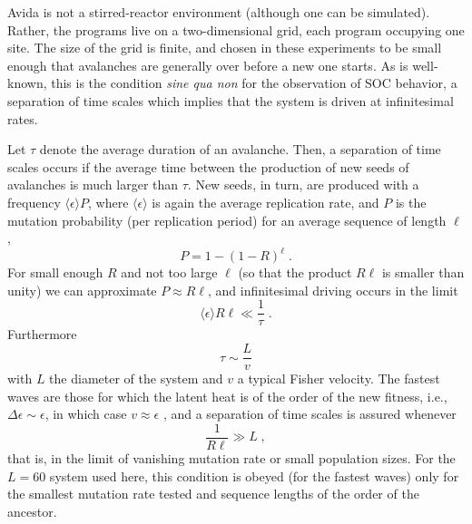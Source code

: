 \documentclass[letterpaper]{article}
\begin{document}
Avida is not a stirred-reactor environment (although one can be
simulated). Rather, the programs live on a two-dimensional grid, each
program occupying one site. The size of the grid is finite, and chosen
in these experiments to be small enough that avalanches are generally
over before a new one starts. As is well-known, this is the condition
{\em sine qua non} for the observation of SOC behavior, a separation
of time scales which implies that the system is driven at
infinitesimal rates.

Let $\tau$ denote the average duration of an avalanche. Then, a
separation of time scales occurs if the average time between the
production of new seeds of avalanches is much larger than $\tau$. New
seeds, in turn, are produced with a frequency $\langle\epsilon\rangle
P$, where $\langle\epsilon\rangle$ is again the average replication
rate, and $P$ is the mutation probability (per replication period) for
an average sequence of length $\ell$,
\begin{equation}
    P=1-(1-R)^\ell\;.
\end{equation}
For small enough $R$ and not too large $\ell$ (so that the product
$R\ell$ is smaller than unity) we can approximate
$P\approx R\ell$, and infinitesimal driving occurs in the limit
\begin{equation}
    \langle \epsilon\rangle R\ell \ll\frac1\tau\;.\label{cond}
\end{equation}
Furthermore
\begin{equation}
    \tau\sim\frac{L}v
\end{equation}
with $L$ the diameter of the system and $v$ a typical Fisher velocity.
The fastest waves are those for which the latent heat is of the order
of the new fitness, i.e., $\Delta\epsilon\sim\epsilon$, in which case
$v\approx \epsilon$ \citep[because $D\sim\epsilon$ in
,][]{CHU}, and a separation of time scales is assured
whenever
\begin{equation}
    \frac{1}{R\ell}\gg {L}\;,
\end{equation}
that is, in the limit of vanishing mutation rate or small population
sizes. For the $L=60$ system used here, this condition is obeyed (for
the fastest waves) only for the smallest mutation rate tested and
sequence lengths of the order of the ancestor.
\end{document}
